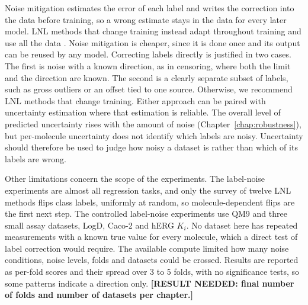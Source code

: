 Noise mitigation estimates the error of each label and writes the correction into the data before training, so a wrong estimate stays in the data for every later model. LNL methods that change training instead adapt throughout training and use all the data \citep{Song2022}. Noise mitigation is cheaper, since it is done once and its output can be reused by any model. Correcting labels directly is justified in two cases. The first is noise with a known direction, as in censoring, where both the limit and the direction are known. The second is a clearly separate subset of labels, such as gross outliers or an offset tied to one source. Otherwise, we recommend LNL methods that change training. Either approach can be paired with uncertainty estimation where that estimation is reliable. The overall level of predicted uncertainty rises with the amount of noise (Chapter~\ref{chap:robustness}), but per-molecule uncertainty does not identify which labels are noisy. Uncertainty should therefore be used to judge how noisy a dataset is rather than which of its labels are wrong.

Other limitations concern the scope of the experiments. The label-noise experiments are almost all regression tasks, and only the survey of twelve LNL methods flips class labels, uniformly at random, so molecule-dependent flips are the first next step. %
The controlled label-noise experiments use QM9 and three small assay datasets, LogD, Caco-2 and hERG $K_i$. No dataset here has repeated measurements with a known true value for every molecule, which a direct test of label correction would require. The available compute limited how many noise conditions, noise levels, folds and datasets could be crossed. Results are reported as per-fold scores and their spread over 3 to 5 folds, with no significance tests, so some patterns indicate a direction only. \textbf{[RESULT NEEDED: final number of folds and number of datasets per chapter.]}



